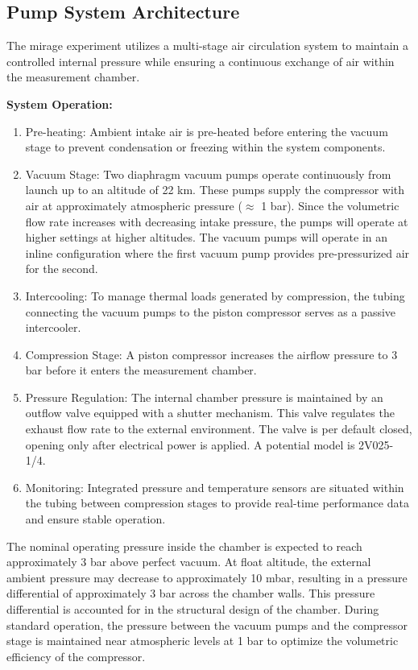 \subsection{Pump System Architecture}\label{sec: pump system arch}

The \gls{mirage} experiment utilizes a multi-stage air circulation system to maintain a controlled internal pressure while ensuring a continuous exchange of air within the measurement chamber.

\textbf{System Operation:}

\begin{enumerate}
    \item Pre-heating: Ambient intake air is pre-heated before entering the vacuum stage to prevent condensation or freezing within the system components.
    \item Vacuum Stage: Two diaphragm vacuum pumps operate continuously from launch up to an altitude of 22 km.
    These pumps supply the compressor with air at approximately atmospheric pressure ($\approx$ 1 bar).
    Since the volumetric flow rate increases with decreasing intake pressure, the pumps will operate at higher settings at higher altitudes. The vacuum pumps will operate in an inline configuration where the first vacuum pump provides pre-pressurized air for the second.
    \item Intercooling: To manage thermal loads generated by compression, the tubing connecting the vacuum pumps to the piston compressor serves as a passive intercooler.
    \item Compression Stage: A piston compressor increases the airflow pressure to 3 bar before it enters the measurement chamber.
    \item Pressure Regulation: The internal chamber pressure is maintained by an outflow valve equipped with a shutter mechanism. This valve regulates the exhaust flow rate to the external environment. The valve is per default closed, opening only after electrical power is applied. A potential model is 2V025-1/4.
    \item Monitoring: Integrated pressure and temperature sensors are situated within the tubing between compression stages to provide real-time performance data and ensure stable operation.
\end{enumerate}

The nominal operating pressure inside the chamber is expected to reach approximately 3 bar above perfect vacuum. At float altitude, the external ambient pressure may decrease to approximately 10 mbar, resulting in a pressure differential of approximately 3 bar across the chamber walls. This pressure differential is accounted for in the structural design of the chamber.
During standard operation, the pressure between the vacuum pumps and the compressor stage is maintained near atmospheric levels at 1 bar to optimize the volumetric efficiency of the compressor.

